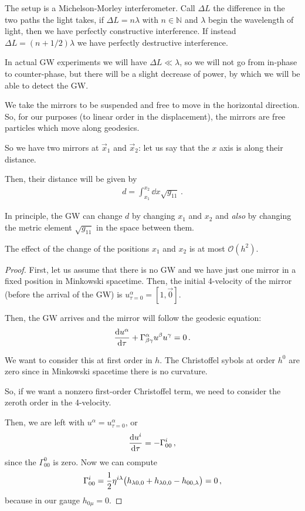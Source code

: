 \documentclass[main.tex]{subfiles}
\begin{document}
The setup is a Michelson-Morley interferometer. 
Call \(\Delta L\) the difference in the two paths the light takes, if \(\Delta L = n \lambda \) with \(n \in \mathbb{N} \) and \(\lambda \) begin the wavelength of light, then we have perfectly constructive interference. 
If instead \(\Delta L = (n + 1/ 2) \lambda \) we have perfectly destructive interference. 

In actual GW experiments we will have \(\Delta L \ll \lambda \), so we will not go from in-phase to counter-phase, but there will be a slight decrease of power, by which we will be able to detect the GW.

We take the mirrors to be suspended and free to move in the horizontal direction. So, for our purposes (to linear order in the displacement), the mirrors are free particles which move along geodesics. 

So we have two mirrors at \(\vec{x}_{1} \) and \(\vec{x}_{2}\): let us say that the \(x\) axis is along their distance. 

Then, their distance will be given by 
%
\begin{align}
d = \int_{x_1 }^{x_2 } \dd{x} \sqrt{g_{11} }
\,.
\end{align}

In principle, the GW can change \(d\) by changing \(x_1 \) and \(x_2 \) and \emph{also} by changing the metric element \(\sqrt{g_{11} }\) in the space between them. 

\begin{claim}
The effect of the change of the positions \(x_1 \) and \(x_2 \) is at most \(\mathcal{O}(h^2)\). 
\end{claim}

\begin{proof}
First, let us assume that there is no GW and we have just one mirror in a fixed position in Minkowski spacetime. 
Then, the initial 4-velocity of the mirror (before the arrival of the GW) is \(u^{\alpha }_{\tau =0} = [1, \vec{0}]\). 

Then, the GW arrives and the mirror will follow the geodesic equation: 
%
\begin{align}
\dv{ u^{\alpha }  }{\tau } + \Gamma^{\alpha }_{\beta \gamma } u^{\beta } u^{\gamma } = 0
\,.
\end{align}

We want to consider this at first order in \(h\). 
The Christoffel sybols at order \(h^{0}\) are zero since in Minkowski spacetime there is no curvature. 

So, if we want a nonzero first-order Christoffel term, we need to consider the zeroth order in the 4-velocity. 

Then, we are left with \(u^{\alpha } = u^{\alpha }_{\tau =0}\), or 
%
\begin{align}
\dv{ u^{i }}{\tau } = - \Gamma^{i }_{00}
\,,
\end{align}
%
since the \(\Gamma^{0}_{00}\) is zero. Now we can compute 
%
\begin{align}
\Gamma^{i}_{00} = \frac{1}{2} \eta^{i \lambda } \qty(h_{\lambda 0, 0} + h_{\lambda 0,0} - h_{00 , \lambda }) = 0 
\,,
\end{align}
%
because in our gauge \(h_{0 \mu } = 0\). 
\end{proof}
\end{document}
